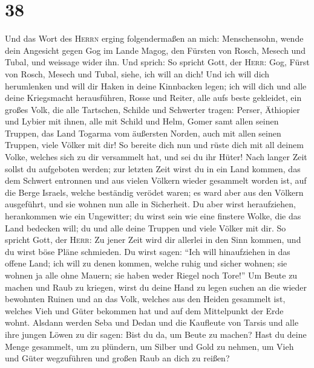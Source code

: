 \hypertarget{section-37}{%
\section{38}\label{section-37}}

 Und das Wort des \textsc{Herrn} erging folgendermaßen an
mich:  Menschensohn, wende dein Angesicht gegen Gog im
Lande Magog, den Fürsten von Rosch, Mesech und Tubal, und weissage wider
ihn.  Und sprich: So spricht Gott, der \textsc{Herr}: Gog,
Fürst von Rosch, Mesech und Tubal, siehe, ich will an dich!
 Und ich will dich herumlenken und will dir Haken in deine
Kinnbacken legen; ich will dich und alle deine Kriegsmacht herausführen,
Rosse und Reiter, alle aufs beste gekleidet, ein großes Volk, die alle
Tartschen, Schilde und Schwerter tragen:  Perser,
Äthiopier und Lybier mit ihnen, alle mit Schild und Helm, 
Gomer samt allen seinen Truppen, das Land Togarma vom äußersten Norden,
auch mit allen seinen Truppen, viele Völker mit dir!  So
bereite dich nun und rüste dich mit all deinem Volke, welches sich zu
dir versammelt hat, und sei du ihr Hüter!  Nach langer
Zeit sollst du aufgeboten werden; zur letzten Zeit wirst du in ein Land
kommen, das dem Schwert entronnen und aus vielen Völkern wieder
gesammelt worden ist, auf die Berge Israels, welche beständig verödet
waren; es ward aber aus den Völkern ausgeführt, und sie wohnen nun alle
in Sicherheit.  Du aber wirst heraufziehen, herankommen
wie ein Ungewitter; du wirst sein wie eine finstere Wolke, die das Land
bedecken will; du und alle deine Truppen und viele Völker mit dir.
 So spricht Gott, der \textsc{Herr}: Zu jener Zeit wird
dir allerlei in den Sinn kommen, und du wirst böse Pläne schmieden.
 Du wirst sagen: ``Ich will hinaufziehen in das offene
Land; ich will zu denen kommen, welche ruhig und sicher wohnen; sie
wohnen ja alle ohne Mauern; sie haben weder Riegel noch Tore!''
 Um Beute zu machen und Raub zu kriegen, wirst du deine
Hand zu legen suchen an die wieder bewohnten Ruinen und an das Volk,
welches aus den Heiden gesammelt ist, welches Vieh und Güter bekommen
hat und auf dem Mittelpunkt der Erde wohnt.  Alsdann
werden Seba und Dedan und die Kaufleute von Tarsis und alle ihre jungen
Löwen zu dir sagen: Bist du da, um Beute zu machen? Hast du deine Menge
gesammelt, um zu plündern, um Silber und Gold zu nehmen, um Vieh und
Güter wegzuführen und großen Raub an dich zu reißen? 
